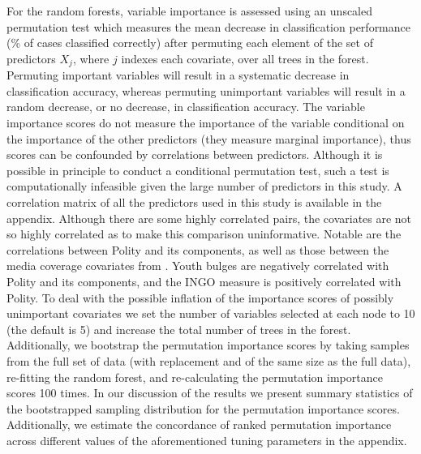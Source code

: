 \documentclass[11pt]{article}
\begin{document}
For the random forests, variable importance is assessed using an unscaled permutation test which measures the mean decrease in classification performance (\% of cases classified correctly) after permuting each element of the set of predictors $X_j$, where $j$ indexes each covariate, over all trees in the forest. Permuting important variables will result in a systematic decrease in classification accuracy, whereas permuting unimportant variables will result in a random decrease, or no decrease, in classification accuracy. The variable importance scores do not measure the importance of the variable conditional on the importance of the other predictors (they measure marginal importance), thus scores can be confounded by correlations between predictors. Although it is possible in principle to conduct a conditional permutation test, such a test is computationally infeasible given the large number of predictors in this study. A correlation matrix of all the predictors used in this study is available in the appendix. Although there are some highly correlated pairs, the covariates are not so highly correlated as to make this comparison uninformative. Notable are the correlations between Polity and its components, as well as those between the media coverage covariates from \citet{RonRamosRodgers2005}. Youth bulges are negatively correlated with Polity and its components, and the INGO measure is positively correlated with Polity. To deal with the possible inflation of the importance scores of possibly unimportant covariates we set the number of variables selected at each node to 10 (the default is 5) and increase the total number of trees in the forest. Additionally, we bootstrap the permutation importance scores by taking samples from the full set of data (with replacement and of the same size as the full data), re-fitting the random forest, and re-calculating the permutation importance scores 100 times. In our discussion of the results we present summary statistics of the bootstrapped sampling distribution for the permutation importance scores. Additionally, we estimate the concordance of ranked permutation importance across different values of the aforementioned tuning parameters in the appendix.
\end{document}
